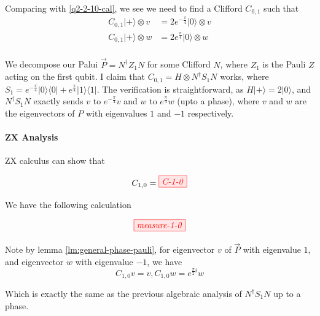 Comparing with \eqref{q2-2-10-cal}, we see we need to find a Clifford $C_{0,1}$ such that 
\begin{equation}
	\begin{split}
		C_{0, 1} |+\rangle \otimes v & = 2 e^{-\frac{\pi}{4}} |0\rangle \otimes v \\
		C_{0, 1} |+\rangle \otimes w & = 2 e^{\frac{\pi}{4}} |0\rangle \otimes w \\
	\end{split}
\end{equation}

We decompose our Palui $\vec{P} = N^{\dagger} Z_1 N$ for some Clifford $N$, where $Z_1$ is the Pauli $Z$ acting on the first qubit. 
I claim that $C_{0,1} = H \otimes N^{\dagger} S_1 N$ works, where $S_1 = e^{-\frac{\pi}{4}} |0 \rangle \langle 0| +  e^{\frac{\pi}{4}} |1 \rangle \langle 1|$.
The verification is straightforward, as $H |+\rangle = 2 |0\rangle$,
and $N^{\dagger}S_1N$ exactly sends $v$ to $e^{-\frac{\pi}{4}} v$ and $w$ to $e^{\frac{\pi}{4}} w$ (upto a phase), where $v$ and $w$ are the eigenvectors of $P$ with eigenvalues $1$ and $-1$ respectively.

\paragraph{ZX Analysis}

ZX calculus can show that

$$
C_{1, 0} =  \tikzfig{C-1-0}
$$

We have the following calculation

$$
\tikzfig{measure-1-0}
$$

Note by lemma \ref{lm:general-phase-pauli}, 
for eigenvector $v$ of $\vec{P}$ with eigenvalue $1$, and eigenvector $w$ with eigenvalue $-1$, we have
$$
	C_{1, 0} v = v, C_{1, 0} w = e^{\frac{\pi}{2}i} w
$$

Which is exactly the same as the previous algebraic analysis of $N^\dagger S_1 N$ up to a phase.
